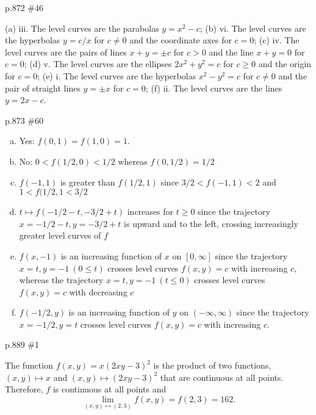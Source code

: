\documentclass[11pt,oneside]{amsart}
\theoremstyle{definition}
\begin{document}
\begin{practice}p.872 \#46\end{practice}
\begin{pracsol}
  (a) iii. The level curves are the parabolas $y=x^2-c$; (b) vi. The level curves are the hyperbolas $y=c/x$ for $c\neq 0$ and the coordinate axes for $c=0$; (c) iv. The level curves are the pairs of lines $x+y=\pm c$ for $c>0$ and the line $x+y=0$ for $c=0$; (d) v. The level curves are the ellipses $2x^2+y^2=c$ for $c\geq 0$ and the origin for $c=0$; (e) i. The level curves are the hyperbolas $x^2-y^2=c$ for $c\neq 0$ and the pair of straight lines $y=\pm x$ for $c=0$; (f) ii. The level curves are the lines $y=2x-c$.
\end{pracsol}
\begin{practice}p.873 \#60\end{practice}
\begin{pracsol}
  \begin{enumerate}[(a)]
    \item Yes: $f(0,1)=f(1,0)=1$.
    \item No: $0<f(1/2,0)<1/2$ whereas $f(0,1/2)=1/2$
    \item $f(-1,1)$ is greater than $f(1/2,1)$ since $3/2<f(-1,1)<2$ and $1<f(1/2,1<3/2$
    \item $t\mapsto f(-1/2-t,-3/2+t)$ increases for $t\geq 0$ since the trajectory $x=-1/2-t,y=-3/2+t$ is upward and to the left, crossing increasingly greater level curves of $f$
    \item $f(x,-1)$ is an increasing function of $x$ on $[0,\infty]$ since the trajectory $x=t,y=-1\ (0\leq t)$ crosses level curves $f(x,y)=c$ with increasing $c$, whereas the trajectory $x=t,y=-1\ (t\leq 0)$ crosses level curves $f(x,y)=c$ with decreasing $c$
    \item $f(-1/2,y)$ is an increasing function of $y$ on $(-\infty,\infty)$ since the trajectory $x=-1/2,y=t$ crosses level curves $f(x,y)=c$ with increasing $c$.
  \end{enumerate}
\end{pracsol}
\begin{practice}p.889 \#1\end{practice}
\begin{pracsol}
  The function $f(x,y)=x(2xy-3)^2$ is the product of two functions, $(x,y)\mapsto x$ and $(x,y)\mapsto (2xy-3)^2$ that are continuous at all points. Therefore, $f$ is continuous at all points and
  \[\lim_{(x,y)\mapsto(2,3)}f(x,y)=f(2,3)=162.\]
\end{pracsol}
\end{document}
